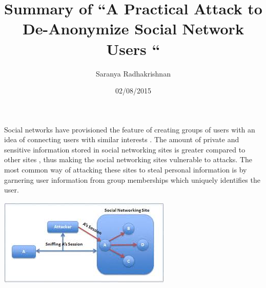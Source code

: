 \documentclass{article}
\title{Summary of  “A Practical Attack to De-Anonymize Social Network Users “}
\author{Saranya Radhakrishnan}
\date{02/08/2015}
\begin{document}
\maketitle

Social networks have provisioned the feature of creating  groups of users with an idea of  connecting users with similar interests . The amount of private and sensitive information stored in social networking sites is greater compared to other sites , thus making the social networking sites vulnerable to attacks. The most common way of attacking these sites to steal personal information is by garnering user information from group memberships which uniquely identifies the user. 

\includegraphics{AttackInGraphicalFormat}
\centering
\end{document}

